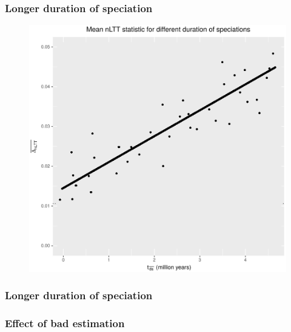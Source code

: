 \documentclass{beamer}
\begin{document}
\begin{frame}
  \frametitle{Longer duration of speciation}

  \begin{figure}[]
    \includegraphics[height=0.8\textheight]{expected_error_mean_durspec.png}
  \end{figure}

\end{frame}

\begin{frame}
  \frametitle{Longer duration of speciation}

  \begin{figure}[]
    
  \end{figure}

\end{frame}

\begin{frame}
  \frametitle{Effect of bad estimation}

  \begin{figure}[]
    \subfloat{
      
    }
    \subfloat{
      
    }
  \end{figure}


\end{frame}
\end{document}
